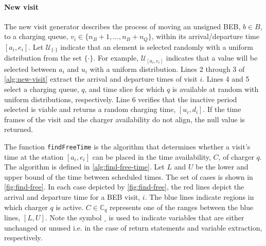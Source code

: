 \documentclass[11pt,a4paper,final]{article}
\newcommand{\C}{\mathbb{C}}                 %
\newcommand{\U}{\mathcal{U}}                %
\begin{document}
\paragraph{New visit}
\label{sec:new-visit}
The new visit generator describes the process of moving an unsigned BEB, \(b \in B\), to a charging queue, \(v_i \in
\{n_B+1,..., n_B + n_Q\}\), within its arrival/departure time \([a_i, e_i]\). Let \(\U_{\{\cdot\}}\) indicate that an element is
selected randomly with a uniform distribution from the set \(\{\cdot\}\). For example, \(\U_{[a_i, e_i]}\) indicates that a
value will be selected between \(a_i\) and \(u_i\) with a uniform distribution. Lines 2 through 3 of \ref{alg:new-visit}
extract the arrival and departure times of visit \(i\). Lines 4 and 5 select a charging queue, \(q\), and time slice for
which \(q\) is available at random with uniform distributions, respectively. Line 6 verifies that the inactive period
selected is viable and returns a random charging time, \([u_i, d_i]\). If the time frames of the visit and the charger
availability do not align, the null value is returned.

The function \texttt{findFreeTime} is the algorithm that determines whether a visit's time at the station \([a_i, e_i]\) can be
placed in the time availability, \(C\), of charger \(q\). The algorithm is defined in \ref{alg:find-free-time}. Let \(L\) and
\(U\) be the lower and upper bound of the time between scheduled times. The set of cases is shown in \ref{fig:find-free}. In
each case depicted by \ref{fig:find-free}, the red lines depict the arrival and departure time for a BEB visit, \(i\). The blue
lines indicate regions in which charger \(q\) is active. \(C \in \C_q\) represents one of the ranges between the blue lines,
\([L, U]\). Note the symbol \(\_\) is used to indicate variables that are either unchanged or unused i.e. in the case of
return statements and variable extraction, respectively.
\end{document}
